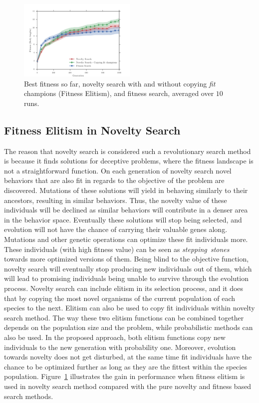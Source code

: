 \documentclass{sig-alternate}
\begin{document}
\begin{figure}[h!]
\centering
\includegraphics[width=0.5\textwidth]{../Figures/Results/CopyFitChampions10.pdf}
\caption{Best fitness so far, novelty search with and without copying \emph{fit} champions (Fitness Elitism), and fitness search, averaged over $10$ runs.}
\label{fig:CopyFitChampions10}
\end{figure}

\subsection{Fitness Elitism in Novelty Search}

The reason that novelty search is considered such a revolutionary search method is because it finds solutions for deceptive problems, where the fitness landscape is not a straightforward function. On each generation of novelty search novel behaviors that are also fit in regards to the objective of the problem are discovered. Mutations of these solutions will yield in behaving similarly to their ancestors, resulting in similar behaviors. Thus, the novelty value of these individuals will be declined as similar behaviors will contribute in a denser area in the behavior space. Eventually these solutions will stop being selected, and evolution will not have the chance of carrying their valuable genes along. Mutations and other genetic operations can optimize these fit individuals more. These individuals (with high fitness value) can be seen as \emph{stepping~stones}~\cite{lehman2011abandoning} towards more optimized versions of them. Being blind to the objective function, novelty search will eventually stop producing new individuals out of them, which will lead to promising individuals being unable to survive through the evolution process. Novelty search can include elitism in its selection process, and it does that by copying the most novel organisms of the current population of each species to the next. Elitism can also be used to copy fit individuals within novelty search method. The way these two elitism functions can be combined together depends on the population size and the problem, while probabilistic methods can also be used. In the proposed approach, both elitism functions copy new individuals to the new generation with probability one. Moreover, evolution towards novelty does not get disturbed, at the same time fit individuals have the chance to be optimized further as long as they are the fittest within the species population. Figure~\ref{fig:CopyFitChampions10} illustrates the gain in performance when fitness elitism is used in novelty search method compared with the pure novelty and fitness based search methods.
\end{document}
